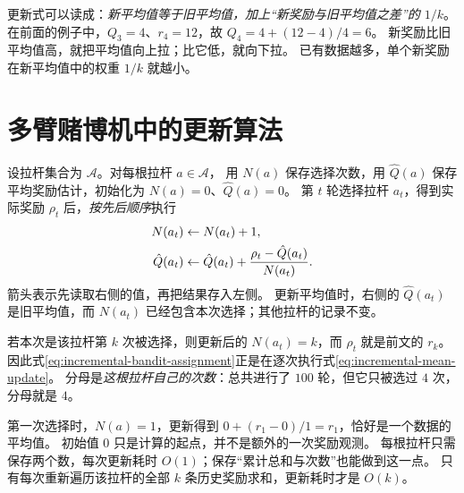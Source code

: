 \documentclass[UTF8,12pt,a4paper,fontset=fandol]{ctexart}
\begin{document}
更新式可以读成：\emph{新平均值等于旧平均值，加上“新奖励与旧平均值之差”的 $1/k$}。
在前面的例子中，$Q_3=4$、$r_4=12$，故 $Q_4=4+(12-4)/4=6$。
新奖励比旧平均值高，就把平均值向上拉；比它低，就向下拉。
已有数据越多，单个新奖励在新平均值中的权重 $1/k$ 就越小。

\section{多臂赌博机中的更新算法}
\label{sec:incremental-mean-algorithm}

设拉杆集合为 $\mathcal A$。对每根拉杆 $a\in\mathcal A$，
用 $N(a)$ 保存选择次数，用 $\hat Q(a)$ 保存平均奖励估计，初始化为 $N(a)=0$、$\hat Q(a)=0$。
第 $t$ 轮选择拉杆 $a_t$，得到实际奖励 $\rho_t$ 后，\emph{按先后顺序}执行
\begin{align}
  N(a_t)&\leftarrow N(a_t)+1,\notag\\
  \hat Q(a_t)&\leftarrow\hat Q(a_t)
    +\frac{\rho_t-\hat Q(a_t)}{N(a_t)}.
  \label{eq:incremental-bandit-assignment}
\end{align}
箭头表示先读取右侧的值，再把结果存入左侧。
更新平均值时，右侧的 $\hat Q(a_t)$ 是旧平均值，而 $N(a_t)$ 已经包含本次选择；其他拉杆的记录不变。

若本次是该拉杆第 $k$ 次被选择，则更新后的 $N(a_t)=k$，而 $\rho_t$ 就是前文的 $r_k$。
因此式\eqref{eq:incremental-bandit-assignment}正是在逐次执行式\eqref{eq:incremental-mean-update}。
分母是\emph{这根拉杆自己的次数}：总共进行了 $100$ 轮，但它只被选过 $4$ 次，分母就是 $4$。

第一次选择时，$N(a)=1$，更新得到 $0+(r_1-0)/1=r_1$，恰好是一个数据的平均值。
初始值 $0$ 只是计算的起点，并不是额外的一次奖励观测。
每根拉杆只需保存两个数，每次更新耗时 $O(1)$；保存“累计总和与次数”也能做到这一点。
只有每次重新遍历该拉杆的全部 $k$ 条历史奖励求和，更新耗时才是 $O(k)$。
\end{document}
